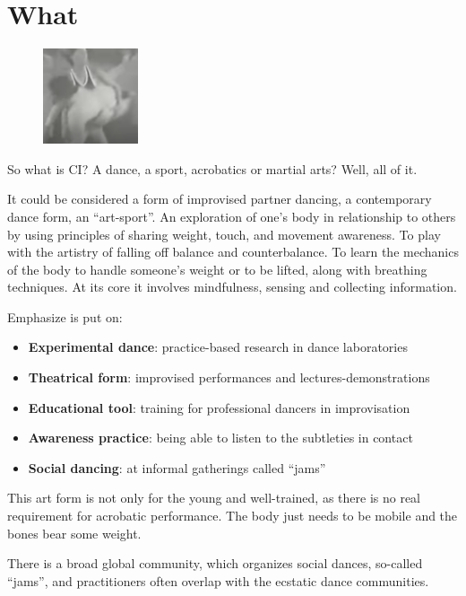 \section{What}\label{sec:what}

\begin{figure}
\centering
\includegraphics[width=0.25\textwidth]{images/what}
\end{figure}

So what is CI? A dance, a sport, acrobatics or martial arts?
Well, all of it.

It could be considered a form of improvised partner dancing, a contemporary dance form, an ``art-sport''.
An exploration of one's body in relationship to others by using principles of sharing weight, touch, and movement awareness.
To play with the artistry of falling off balance and counterbalance.
To learn the mechanics of the body to handle someone's weight or to be lifted, along with breathing techniques.
At its core it involves mindfulness, sensing and collecting information.

Emphasize is put on:
\begin{itemize}
	\item \textbf{Experimental dance}: practice-based research in dance laboratories
	\item \textbf{Theatrical form}: improvised performances and lectures-demonstrations
	\item \textbf{Educational tool}: training for professional dancers in improvisation
	\item \textbf{Awareness practice}: being able to listen to the subtleties in contact
	\item \textbf{Social dancing}: at informal gatherings called ``jams''
\end{itemize}

This art form is not only for the young and well-trained, as there is no real requirement for acrobatic performance.
The body just needs to be mobile and the bones bear some weight.

There is a broad global community, which organizes social dances, so-called ``jams'', and practitioners often overlap with the ecstatic dance communities.


